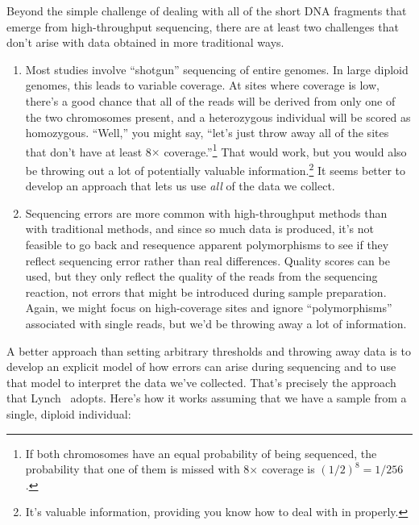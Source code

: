 \documentclass[12pt]{article}
\begin{document}
Beyond the simple challenge of dealing with all of the short DNA
fragments that emerge from high-throughput sequencing, there are at
least two challenges that don't arise with data obtained in more
traditional ways.

\begin{enumerate}

\item Most studies involve ``shotgun'' sequencing of entire
  genomes. In large diploid genomes, this leads to variable
  coverage. At sites where coverage is low, there's a good chance that
  all of the reads will be derived from only one of the two
  chromosomes present, and a heterozygous individual will be scored as
  homozygous. ``Well,'' you might say, ``let's just throw away all of
  the sites that don't have at least 8$\times$ coverage.''\footnote{If
    both chromosomes have an equal probability of being sequenced, the
    probability that one of them is missed with 8$\times$ coverage is
    $(1/2)^8 = 1/256$.} That would work, but you would also be
  throwing out a lot of potentially valuable information.\footnote{It's
    valuable information, providing you know how to deal with in
    properly.} It seems better to develop an approach that lets us use
  {\it all\/} of the data we collect.

\item Sequencing errors are more common with high-throughput methods
  than with traditional methods, and since so much data is produced,
  it's not feasible to go back and resequence apparent polymorphisms
  to see if they reflect sequencing error rather than real
  differences. Quality scores can be used, but they only reflect the
  quality of the reads from the sequencing reaction, not errors that
  might be introduced during sample preparation. Again, we might focus
  on high-coverage sites and ignore ``polymorphisms'' associated with
  single reads, but we'd be throwing away a lot of
  information.

\end{enumerate}
A better approach than setting arbitrary thresholds and throwing away
data is to develop an explicit model of how errors can arise during
sequencing and to use that model to interpret the data we've
collected. That's precisely the approach that Lynch~\cite{Lynch-2008}
adopts. Here's how it works assuming that we have a sample from a
single, diploid individual:
\end{document}
